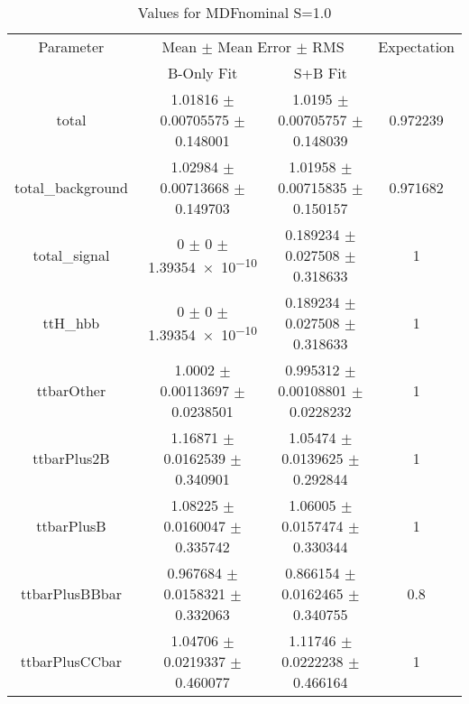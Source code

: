\begin{table}
\centering
\caption{Values for MDFnominal S=1.0}
\begin{tabular}{cccc}
\toprule
Parameter & \multicolumn{2}{c}{Mean $\pm$ Mean Error $\pm$ RMS} & Expectation\\
 & B-Only Fit & S+B Fit & \\
\midrule
total & \num{1.01816} $\pm$ \num{0.00705575} $\pm$ \num{0.148001} & \num{1.0195} $\pm$ \num{0.00705757} $\pm$ \num{0.148039} & \num{0.972239}\\
total\_background & \num{1.02984} $\pm$ \num{0.00713668} $\pm$ \num{0.149703} & \num{1.01958} $\pm$ \num{0.00715835} $\pm$ \num{0.150157} & \num{0.971682}\\
total\_signal & \num{0} $\pm$ \num{0} $\pm$ \num{1.39354e-10} & \num{0.189234} $\pm$ \num{0.027508} $\pm$ \num{0.318633} & \num{1}\\
ttH\_hbb & \num{0} $\pm$ \num{0} $\pm$ \num{1.39354e-10} & \num{0.189234} $\pm$ \num{0.027508} $\pm$ \num{0.318633} & \num{1}\\
ttbarOther & \num{1.0002} $\pm$ \num{0.00113697} $\pm$ \num{0.0238501} & \num{0.995312} $\pm$ \num{0.00108801} $\pm$ \num{0.0228232} & \num{1}\\
ttbarPlus2B & \num{1.16871} $\pm$ \num{0.0162539} $\pm$ \num{0.340901} & \num{1.05474} $\pm$ \num{0.0139625} $\pm$ \num{0.292844} & \num{1}\\
ttbarPlusB & \num{1.08225} $\pm$ \num{0.0160047} $\pm$ \num{0.335742} & \num{1.06005} $\pm$ \num{0.0157474} $\pm$ \num{0.330344} & \num{1}\\
ttbarPlusBBbar & \num{0.967684} $\pm$ \num{0.0158321} $\pm$ \num{0.332063} & \num{0.866154} $\pm$ \num{0.0162465} $\pm$ \num{0.340755} & \num{0.8}\\
ttbarPlusCCbar & \num{1.04706} $\pm$ \num{0.0219337} $\pm$ \num{0.460077} & \num{1.11746} $\pm$ \num{0.0222238} $\pm$ \num{0.466164} & \num{1}\\
\bottomrule
\end{tabular}
\end{table}